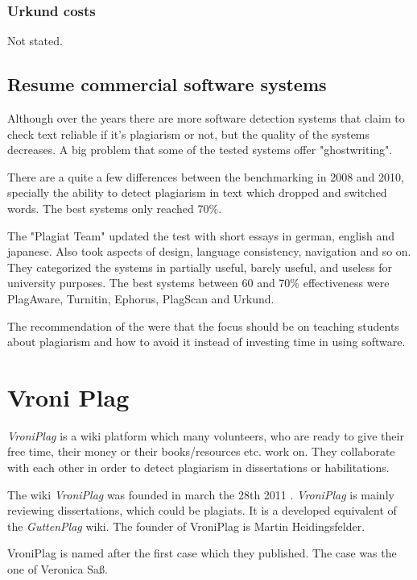 \subsubsection{Urkund costs}
Not stated.


\newpage

\subsection{Resume commercial software systems}

Although over the years there are more software detection systems that claim to check text reliable if it's plagiarism or not, but the quality of the systems decreases. 
A big problem that some of the tested systems offer "ghostwriting".

There are a quite a few differences between the benchmarking in 2008 and 2010, specially the ability to detect plagiarism in text which dropped and switched words. The best systems only reached 70\%.

The "Plagiat Team" updated the test with short essays in german, english and japanese.
Also took aspects of design, language consistency, navigation and so on.
They  categorized the systems in partially useful, barely useful, and useless for university purposes. The best systems between 60 and 70\% effectiveness were PlagAware, Turnitin, Ephorus, PlagScan and Urkund. \citep{PlagiatTeam} 

The recommendation of  the \citet{PlagiatTeam} were that the focus should be on teaching students about plagiarism and how to avoid it instead of investing time in using software. 


\section{Vroni Plag}
\textit{VroniPlag}  is a wiki platform which many volunteers, who are ready to give their free time, their money or 
their books/resources etc. work on. They collaborate with each other in order to detect plagiarism in dissertations or
habilitations.

The wiki \textit{VroniPlag} was founded in march the 28th 2011 . \textit{VroniPlag}  is mainly reviewing dissertations, which could be plagiats. It is a developed equivalent of the \textit{GuttenPlag} wiki. The founder of VroniPlag is Martin Heidingsfelder.
\citep{Wikipedia}


VroniPlag is named after the first case which they published. The case was the one of Veronica Saß.


